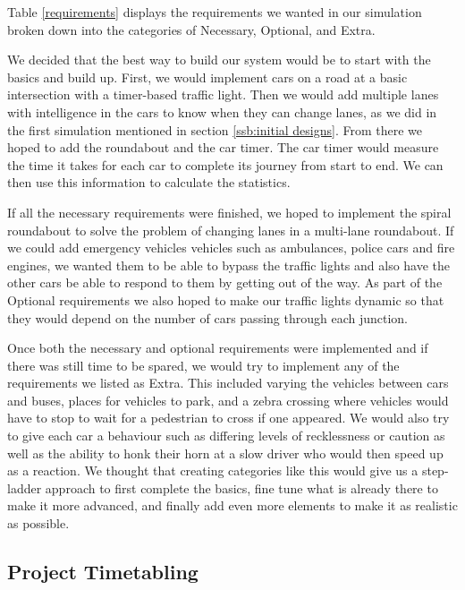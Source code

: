 \documentclass{article}
\begin{document}
    
    
Table \ref{requirements} displays the requirements we wanted in our simulation broken down into the categories of Necessary, Optional, and Extra. 

We decided that the best way to build our system would be to start with the basics and build up. First, we would implement cars on a road at a basic intersection with a timer-based traffic light. Then we would add multiple lanes with intelligence in the cars to know when they can change lanes, as we did in the first simulation mentioned in section \ref{ssb:initial designs}. From there we hoped to add the roundabout and the car timer. The car timer would measure the time it takes for each car to complete its journey from start to end. We can then use this information to calculate the statistics. 

If all the necessary requirements were finished, we hoped to implement the spiral roundabout to solve the problem of changing lanes in a multi-lane roundabout. If we could add emergency vehicles vehicles such as ambulances, police cars and fire engines, we wanted them to be able to bypass the traffic lights and also have the other cars be able to respond to them by getting out of the way. As part of the Optional requirements we also hoped to make our traffic lights dynamic so that they would depend on the number of cars passing through each junction.


 Once both the necessary and optional requirements were implemented and if there was still time to be spared, we would try to implement any of the requirements we listed as Extra. This included varying the vehicles between cars and buses, places for vehicles to park, and a zebra crossing where vehicles would have to stop to wait for a pedestrian to cross if one appeared. We would also try to give each car a behaviour such as differing levels of recklessness or caution as well as the ability to honk their horn at a slow driver who would then speed up as a reaction.
\newline\indent	We thought that creating categories like this would give us a step-ladder approach to first complete the basics, fine tune what is already there to make it more advanced, and finally add even more elements to make it as realistic as possible.


\subsection{Project Timetabling}
\end{document}
